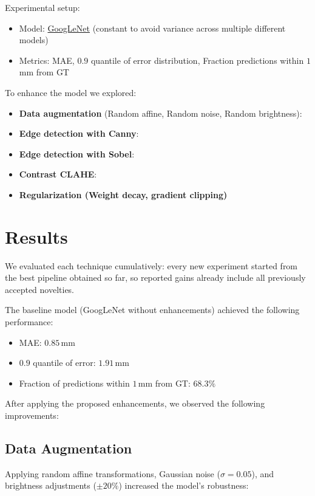 \documentclass{article}
\begin{document}
Experimental setup:

\begin{itemize}
    \item Model: \href{https://arxiv.org/pdf/1409.4842}{GoogLeNet} (constant to avoid variance across multiple different models)
    \item Metrics: MAE, $0.9$ quantile of error distribution, Fraction predictions within $1$ mm from GT
\end{itemize}

To enhance the model we explored:

\begin{itemize}
    \item \textbf{Data augmentation} (Random affine, Random noise, Random brightness):
    \item \textbf{Edge detection with Canny}:
    \item \textbf{Edge detection with Sobel}:
    \item \textbf{Contrast CLAHE}:
    \item \textbf{Regularization (Weight decay, gradient clipping)}
\end{itemize}

\section{Results}

We evaluated each technique cumulatively: every new experiment started from the best pipeline obtained so far, so reported gains already include all previously accepted novelties.

The baseline model (GoogLeNet without enhancements) achieved the following
performance:

\begin{itemize}
    \item MAE: $0.85\,\text{mm}$
    \item $0.9$ quantile of error: $1.91\,\text{mm}$
    \item Fraction of predictions within $1\,\text{mm}$ from GT: $68.3\%$
\end{itemize}

After applying the proposed enhancements, we observed the following improvements:

\subsection{Data Augmentation}
Applying random affine transformations, Gaussian noise ($\sigma = 0.05$), and brightness adjustments ($\pm20\%$) increased the model's robustness:
\end{document}
